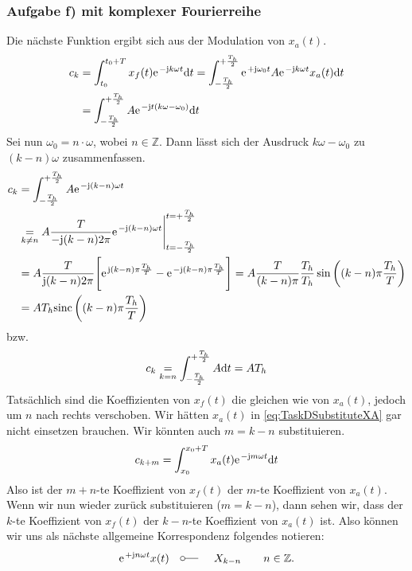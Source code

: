 \documentclass[11pt,a4paper,DIV=12]{scrartcl}
\newcommand{\sinc}{\mathrm{sinc}}
\begin{document}
\subsubsection{Aufgabe f) mit komplexer Fourierreihe}
%
\label{sec:TaskDComplex}
%
Die nächste Funktion ergibt sich aus der Modulation von $x_{a}(t)$.
%
%
%
\begin{align}
	\label{eq:TaskDSubstituteXA}
	c_k&=\int_{t_0}^{t_0+T}x_{f}(t)\e^{-\im k \omega t}\diff t
	=\int_{-\frac{T_h}{2}}^{+\frac{T_h}{2}}\e^{+\im\omega_0 t}A\e^{-\im k \omega t}x_a(t)\diff t \\
	&=\int_{-\frac{T_h}{2}}^{+\frac{T_h}{2}}A\e^{-\im t(k\omega -\omega_0)}\diff t
\end{align}
%
Sei nun $\omega_0=n\cdot\omega$, wobei $n\in\mathbb{Z}$.
%
Dann lässt sich der Ausdruck $k\omega -\omega_0$ zu $(k-n)\omega$
zusammenfassen.
%
%
\begin{align}
	c_k&=\int_{-\frac{T_h}{2}}^{+\frac{T_h}{2}}A\e^{-\im (k-n)\omega t} \nonumber \\
	&\underset{k\neq n}{=}A\frac{T}{-\im (k-n) 2\pi}\e^{-\im (k-n)\omega t}\Bigg |_{t=-\frac{T_h}{2}}^{t=+\frac{T_h}{2}} \nonumber \\
	&=A\frac{T}{\im (k-n)2 \pi}\Bigg [\e^{\im (k-n)\pi\frac{T_h}{T}}-\e^{-\im (k-n)\pi \frac{T_h}{T}}\Bigg ]
	= A\frac{T}{(k-n)\pi}\frac{T_h}{T_h}\sin\left((k-n)\pi\frac{T_h}{T}\right)\nonumber\\
	&=AT_h\sinc\left((k-n)\pi\frac{T_h}{T}\right)
\end{align}
%
bzw.
%
\begin{align}
	c_k\underset{k=n}{=}\int_{-\frac{T_h}{2}}^{+\frac{T_h}{2}}A\mathrm{d} t=AT_h
\end{align}
%
Tatsächlich sind die Koeffizienten von $x_{f}(t)$ die gleichen wie von
$x_{a}(t)$, jedoch um $n$ nach rechts verschoben.
%
Wir hätten $x_{a}(t)$ in \eqref{eq:TaskDSubstituteXA} gar nicht einsetzen brauchen.
%
Wir könnten auch $m=k-n$ substituieren.
%
\begin{align}
	c_{k+m}=\int_{x_0}^{x_0+T}x_{a}(t)\e^{-\im m \omega t}\diff t
\end{align}
Also ist der $m+n$-te Koeffizient von $x_{f}(t)$ der $m$-te Koeffizient von
$x_{a}(t)$.
%
Wenn wir nun wieder zurück substituieren ($m=k-n$), dann sehen wir, dass der $k$-te Koeffizient von $x_{f}(t)$ der $k-n$-te Koeffizient von $x_{a}(t)$ ist.
%
Also können wir uns als nächste allgemeine Korrespondenz folgendes notieren:
%
%
\begin{align}
	\label{eq:CorrespondenceModulation}
	\e^{+\im n \omega t}x(t)\quad\fourier\quad X_{k-n}\quad\quad n\in\mathbb{Z}.
\end{align}
\end{document}
